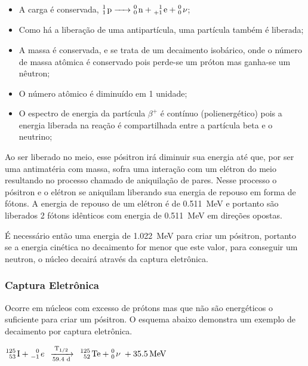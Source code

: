 \documentclass[11pt,a4paper]{article}
\newcounter{exemplo}
\begin{document}
                \begin{itemize}
                    \item A carga é conservada, $\ce{^{1}_{1} p -> ^{0}_{0} n + ^{1}_{+1} e + ^{0}_{0} \nu}$;
                    \item Como há a liberação de uma antipartícula, uma partícula também é liberada;
                    \item A massa é conservada, e se trata de um decaimento isobárico, onde o número de massa atômica é conservado pois perde-se um próton mas ganha-se um nêutron;
                    \item O número atômico é diminuído em 1 unidade;
                    \item O espectro de energia da partícula $\beta^+$ é contínuo (polienergético) pois a energia liberada na reação é compartilhada entre a partícula beta e o neutrino;
                \end{itemize}

                Ao ser liberado no meio, esse pósitron irá diminuir sua energia até que, por ser uma antimatéria com massa, sofra uma interação com um elétron do meio resultando no processo chamado de aniquilação de pares. Nesse processo o pósitron e o elétron se aniquilam liberando sua energia de repouso em forma de fótons. A energia de repouso de um elétron é de \qty{0.511}{MeV} e portanto são liberados 2 fótons idênticos com energia de \qty{0.511}{MeV} em direções opostas. 

                É necessário então uma energia de \qty{1.022}{MeV} para criar um pósitron, portanto se a energia cinética no decaimento for menor que este valor, para conseguir um neutron, o núcleo decairá através da captura eletrônica.

            \subsubsection{Captura Eletrônica}

                Ocorre em núcleos com excesso de prótons mas que não são energéticos o suficiente para criar um pósitron. O esquema abaixo demonstra um exemplo de decaimento por captura eletrônica.

                \begin{center}
                    $\ce{^{125}_{53} I +  ^{0}_{-1} e \; ->[{T_{1/2}}][{59.4 d}] \; ^{125}_{52} Te +  ^{0}_{0} \nu \; + 35.5 MeV}$
                \end{center}
\end{document}
